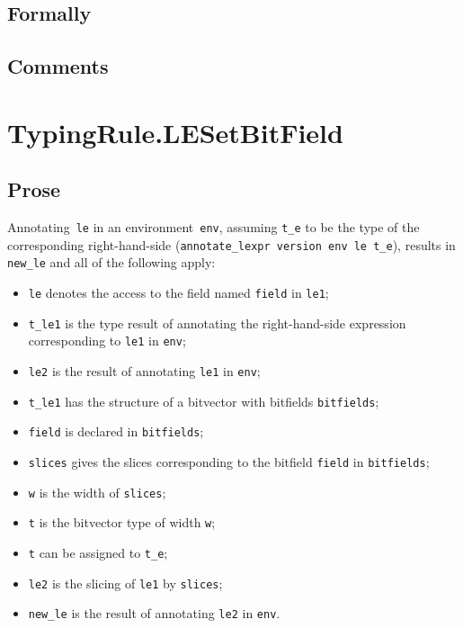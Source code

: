 \documentclass{book}
\begin{document}
  \subsection{Formally}

  \subsection{Comments}

\section{TypingRule.LESetBitField \label{sec:TypingRule.LESetBitField}}

    \subsection{Prose}
   Annotating~\texttt{le} in an environment~\texttt{env}, assuming
\texttt{t\_e} to be the type of the corresponding right-hand-side
(\texttt{annotate\_lexpr version env le t\_e}), results in \texttt{new\_le} and
all of the following apply:
   \begin{itemize}
   \item \texttt{le} denotes the access to the field named \texttt{field} in \texttt{le1};
   \item \texttt{t\_le1} is the type result of annotating the right-hand-side expression corresponding to \texttt{le1} in \texttt{env};
   \item \texttt{le2} is the result of annotating \texttt{le1} in \texttt{env};
   \item \texttt{t\_le1} has the structure of a bitvector with bitfields \texttt{bitfields};
   \item \texttt{field} is declared in \texttt{bitfields};
   \item \texttt{slices} gives the slices corresponding to the bitfield \texttt{field} in
      \texttt{bitfields};
   \item \texttt{w} is the width of \texttt{slices};
   \item \texttt{t} is the bitvector type of width \texttt{w};
   \item \texttt{t} can be assigned to \texttt{t\_e};
   \item \texttt{le2} is the slicing of \texttt{le1} by \texttt{slices};
   \item \texttt{new\_le} is the result of annotating \texttt{le2} in \texttt{env}.
   \end{itemize}
\end{document}
